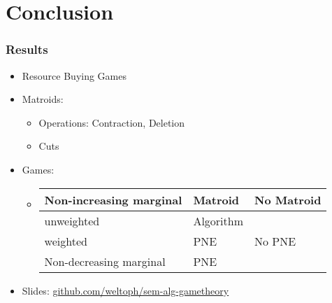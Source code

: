 \documentclass{beamer}
\begin{document}
\section{Conclusion}
\begin{frame}
  \frametitle{Results}
  \begin{itemize}
    \item Resource Buying Games
    \item<2-> Matroids:
      \parbox{6cm}{
        \begin{itemize}
          \item Operations: Contraction, Deletion
          \item Cuts
        \end{itemize}
      }
    \item<3-> Games:
      \parbox{8cm}{
        \begin{itemize}
          \item \parbox{6cm}{
              \begin{tabular}{|l|ll|}
                \hline
                Non-increasing marginal & Matroid & No Matroid\\\hline
                unweighted & Algorithm & \\
                weighted & PNE & No PNE\\\hline
                Non-decreasing marginal & PNE & \\\hline
              \end{tabular}
            }
        \end{itemize}
      }
    \item<4-> Slides: \url{github.com/weltoph/sem-alg-gametheory}
  \end{itemize}
\end{frame}
\end{document}
